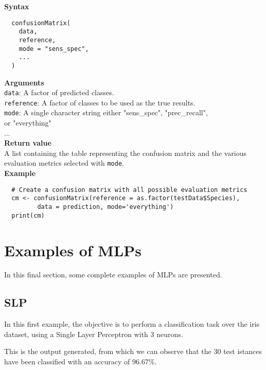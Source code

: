 \documentclass{article}
\begin{document}
\textbf{Syntax}
\begin{verbatim}
  confusionMatrix(
    data,
    reference,
    mode = "sens_spec",
    ...
  )
\end{verbatim}

\textbf{Arguments}\\

\texttt{data}: A factor of predicted classes.\\
\texttt{reference}: A factor of classes to be used as the true results.\\
\texttt{mode}: A single character string either "sens\_spec", "prec\_recall",\\
\phantom{..........}or "everything"\\
...\\

\textbf{Return value}\\

A list containing the table representing the confusion matrix and the various evaluation metrics selected with \texttt{mode}.\\

\textbf{Example}\\

\begin{lstlisting}
  # Create a confusion matrix with all possible evaluation metrics
  cm <- confusionMatrix(reference = as.factor(testData$Species), 
         data = prediction, mode='everything')
  print(cm)
\end{lstlisting}

\section{Examples of MLPs}
In this final section, some complete examples of MLPs are presented.\\

\subsection{SLP}
In this first example, the objective is to perform a classification task over the iris dataset, using a Single Layer Perceptron with 3 neurons.\\



\pagebreak

This is the output generated, from which we can observe that the 30 test istances have been classified with an accuracy of 96.67\%.\\
\end{document}
